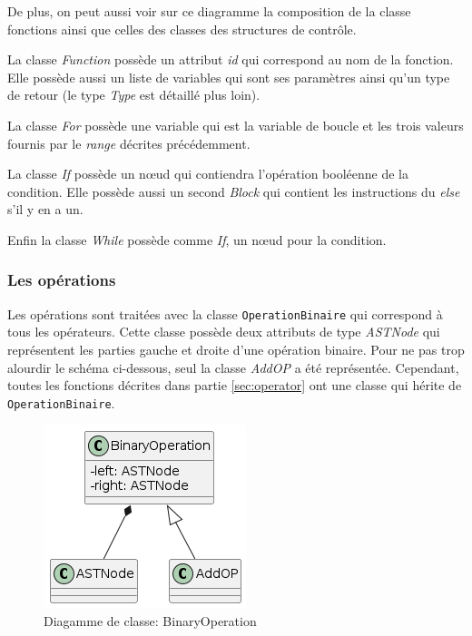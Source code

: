 \documentclass[a4paper]{article}%
\begin{document}
De plus, on peut aussi voir sur ce diagramme la composition de la classe
fonctions ainsi que celles des classes des structures de contrôle.

La classe \textit{Function} possède un attribut \textit{id} qui correspond au nom de la
fonction. Elle possède aussi un liste de variables qui sont ses paramètres ainsi
qu'un type de retour (le type \textit{Type} est détaillé plus loin).

La classe \textit{For} possède une variable qui est la variable de boucle et les
trois valeurs fournis par le \textit{range} décrites précédemment.

La classe \textit{If} possède un nœud qui contiendra l'opération booléenne de la
condition. Elle possède aussi un second \textit{Block} qui contient les
instructions du \textit{else} s'il y en a un.

Enfin la classe \textit{While} possède comme \textit{If}, un nœud pour la
condition.

\subsubsection*{Les opérations}

Les opérations sont traitées avec la classe \lstinline{OperationBinaire} qui
correspond à tous les opérateurs. Cette classe possède deux attributs de type
\textit{ASTNode} qui représentent les parties gauche et droite d'une opération
binaire. Pour ne pas trop alourdir le schéma ci-dessous, seul la classe
\textit{AddOP} a été représentée. Cependant, toutes les fonctions décrites dans
partie \ref{sec:operator} ont une classe qui hérite de
\lstinline{OperationBinaire}.
\clearpage

\begin{figure}[h!]
  \begin{center}
  \includegraphics[scale=0.5]{../ressources/diagrams/binaryOp.png}
  \caption{Diagamme de classe: BinaryOperation}
  \end{center}
\end{figure}
\end{document}
